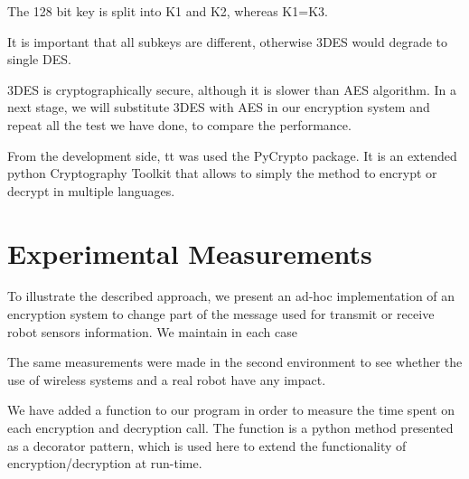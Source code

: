 \documentclass[journal,twoside]{JoPhA}
\begin{document}
The 128 bit key is split into K1 and K2, whereas K1=K3.

It is important that all subkeys are different, otherwise 3DES would degrade to single DES.

3DES is cryptographically secure, although it is slower than AES algorithm. In a next stage, we will substitute 3DES with AES in our encryption system and repeat all the test we have done, to compare the performance.


From the development side, tt was used the PyCrypto package. It is an extended python Cryptography Toolkit that allows to simply the method to encrypt or decrypt in multiple languages. 



\section{Experimental Measurements}
\label{experiments}

To illustrate the described approach, we present an ad-hoc implementation of an encryption system to change part of the message used for transmit or receive robot sensors information. 
We maintain in each case 


The same measurements were made in the second environment to see whether the use of wireless systems and a real robot have any impact.



We have added a function to our program in order to measure the time spent on each encryption and decryption call. The function is a python method presented as a decorator pattern, which is used here to extend the functionality of encryption/decryption at run-time. 
\end{document}
